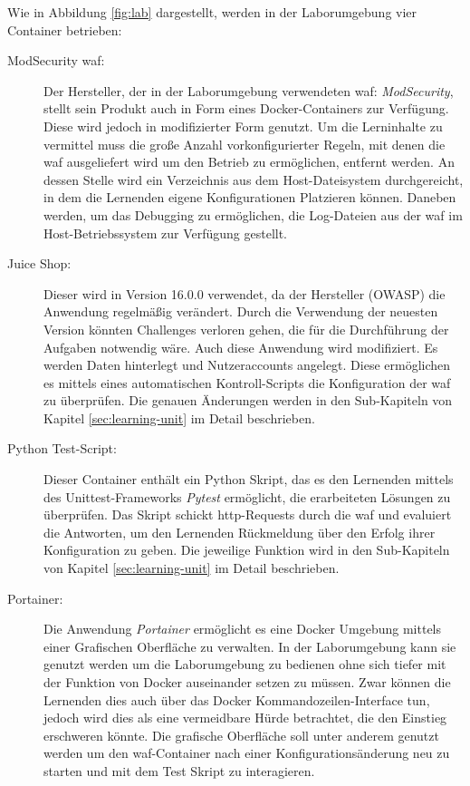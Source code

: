 Wie in Abbildung \ref{fig:lab} dargestellt, werden in der Laborumgebung vier Container betrieben:

\begin{description}
    \item[ModSecurity \ac{waf}:] Der Hersteller, der in der Laborumgebung verwendeten \ac{waf}: \textit{ModSecurity}, stellt sein Produkt auch in Form eines Docker-Containers zur Verfügung. 
    Diese wird jedoch in modifizierter Form genutzt.
    Um die Lerninhalte zu vermittel muss die große Anzahl vorkonfigurierter Regeln, mit denen die \ac{waf} ausgeliefert wird um den Betrieb zu ermöglichen, entfernt werden.
    An dessen Stelle wird ein Verzeichnis aus dem Host-Dateisystem durchgereicht, in dem die Lernenden eigene Konfigurationen Platzieren können.
    Daneben werden, um das Debugging zu ermöglichen, die Log-Dateien aus der \ac{waf} im Host-Betriebssystem zur Verfügung gestellt.
    
    \item[Juice Shop:] Dieser wird in Version 16.0.0 verwendet, da der Hersteller (OWASP) die Anwendung regelmäßig verändert.
    Durch die Verwendung der neuesten Version könnten Challenges verloren gehen, die für die Durchführung der Aufgaben notwendig wäre.
    Auch diese Anwendung wird modifiziert.
    Es werden Daten hinterlegt und Nutzeraccounts angelegt.
    Diese ermöglichen es mittels eines automatischen Kontroll-Scripts die Konfiguration der \ac{waf} zu überprüfen.
    Die genauen Änderungen werden in den Sub-Kapiteln von Kapitel \ref{sec:learning-unit} im Detail beschrieben.

    \item[Python Test-Script:] Dieser Container enthält ein Python Skript, das es den Lernenden mittels des Unittest-Frameworks \textit{Pytest} ermöglicht, die erarbeiteten Lösungen zu überprüfen.
    Das Skript schickt \ac{http}-Requests durch die \ac{waf} und evaluiert die Antworten, um den Lernenden Rückmeldung über den Erfolg ihrer Konfiguration zu geben.
    Die jeweilige Funktion wird in den Sub-Kapiteln von Kapitel \ref{sec:learning-unit} im Detail beschrieben.

    \item[Portainer:] Die Anwendung \textit{Portainer} ermöglicht es eine Docker Umgebung mittels einer Grafischen Oberfläche zu verwalten.
    In der Laborumgebung kann sie genutzt werden um die Laborumgebung zu bedienen ohne sich tiefer mit der Funktion von Docker auseinander setzen zu müssen.
    Zwar können die Lernenden dies auch über das Docker Kommandozeilen-Interface tun, jedoch wird dies als eine vermeidbare Hürde betrachtet, die den Einstieg erschweren könnte.
    Die grafische Oberfläche soll unter anderem genutzt werden um den \ac{waf}-Container nach einer Konfigurationsänderung neu zu starten und mit dem Test Skript zu interagieren. 
\end{description}

